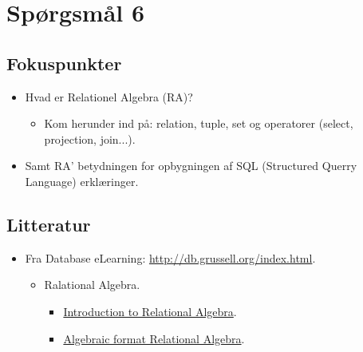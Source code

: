\section{Spørgsmål 6}


\subsection{Fokuspunkter}
\begin{itemize}
	\item Hvad er Relationel Algebra (RA)?
	\begin{itemize}
		\item Kom herunder ind på: relation, tuple, set og operatorer (select, projection, join...).
	\end{itemize}
	\item Samt RA' betydningen for opbygningen af  SQL (Structured Querry Language) erklæringer.
\end{itemize}

\subsection{Litteratur}
\begin{itemize}
	
	
	\item Fra Database eLearning: \url{http://db.grussell.org/index.html}.
	\begin{itemize}
		\item Ralational Algebra.
		\begin{itemize}
			\item \href{http://db.grussell.org/section010.html}{Introduction to Relational Algebra}.
			\item \href{http://db.grussell.org/section011.html}{Algebraic format Relational Algebra}.
		\end{itemize}
	\end{itemize}
	
%	
\end{itemize}

